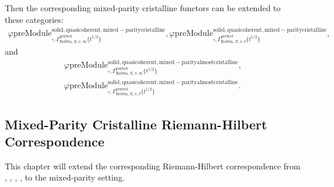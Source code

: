 \documentclass[12pt]{book}
\theoremstyle{definition}
\begin{document}
\indent Then the corresponding mixed-parity cristalline functors can be extended to these categories:
\begin{align}
\varphi\mathrm{preModule}^\mathrm{solid,quasicoherent,mixed-paritycristalline}_{\square,\Gamma^\mathrm{perfect}_{\text{Robba},X,v,\infty}\{t^{1/2}\}},
\varphi\mathrm{preModule}^\mathrm{solid,quasicoherent,mixed-paritycristalline}_{\square,\Gamma^\mathrm{perfect}_{\text{Robba},X,v,I}\{t^{1/2}\}}, 
\end{align}
and
\begin{align}
\varphi\mathrm{preModule}^\mathrm{solid,quasicoherent,mixed-parityalmostcristalline}_{\square,\Gamma^\mathrm{perfect}_{\text{Robba},X,v,\infty}\{t^{1/2}\}},\\
\varphi\mathrm{preModule}^\mathrm{solid,quasicoherent,mixed-parityalmostcristalline}_{\square,\Gamma^\mathrm{perfect}_{\text{Robba},X,v,I}\{t^{1/2}\}}. 
\end{align}


\subsection{Mixed-Parity Cristalline Riemann-Hilbert Correspondence}


\indent This chapter will extend the corresponding Riemann-Hilbert correspondence from \cite{Sch1}, \cite{LZ}, \cite{BL1}, \cite{BL2}, \cite{M} to the mixed-parity setting.
\end{document}
